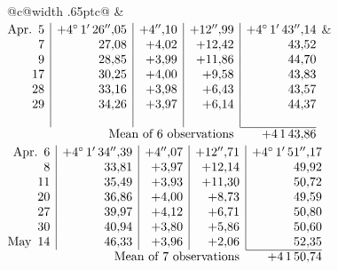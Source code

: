 \noindent\begin{tabular}{@{}c@{\hspace{.4em}\vrule width .65pt\hspace{.4em}}c@{}}
 &
 \\[.18ex]
\(\begin{array}[t]{@{}r|r|r|r|r@{}}
\text{Apr.}\enspace 5 & +4^\circ\,1'\,26''{,}05 & +4''{,}10 & +12''{,}99 & +4^\circ\,1'\,43''{,}14\\
7 & 27{,}08 & +4{,}02 & +12{,}42 & 43{,}52\\
9 & 28{,}85 & +3{,}99 & +11{,}86 & 44{,}70\\
17 & 30{,}25 & +4{,}00 & +9{,}58 & 43{,}83\\
28 & 33{,}16 & +3{,}98 & +6{,}43 & 43{,}57\\
29 & 34{,}26 & +3{,}97 & +6{,}14 & 44{,}37\\
 & & & & \\
\cline{5-5}
\multicolumn{4}{r}{\text{Mean of 6 observations}} & +4\,1\,43{,}86
\end{array}\)
&
\(\begin{array}[t]{@{}r|r|r|r|r@{}}
\text{Apr.}\enspace 6 & +4^\circ\,1'\,34''{,}39 & +4''{,}07 & +12''{,}71 & +4^\circ\,1'\,51''{,}17\\
8 & 33{,}81 & +3{,}97 & +12{,}14 & 49{,}92\\
11 & 35{,}49 & +3{,}93 & +11{,}30 & 50{,}72\\
20 & 36{,}86 & +4{,}00 & +8{,}73 & 49{,}59\\
27 & 39{,}97 & +4{,}12 & +6{,}71 & 50{,}80\\
30 & 40{,}94 & +3{,}80 & +5{,}86 & 50{,}60\\
\text{May}\enspace 14 & 46{,}33 & +3{,}96 & +2{,}06 & 52{,}35\\
\cline{5-5}
\multicolumn{4}{r}{\text{Mean of 7 observations}} & +4\,1\,50{,}74
\end{array}\)
\end{tabular}\par\medskip
